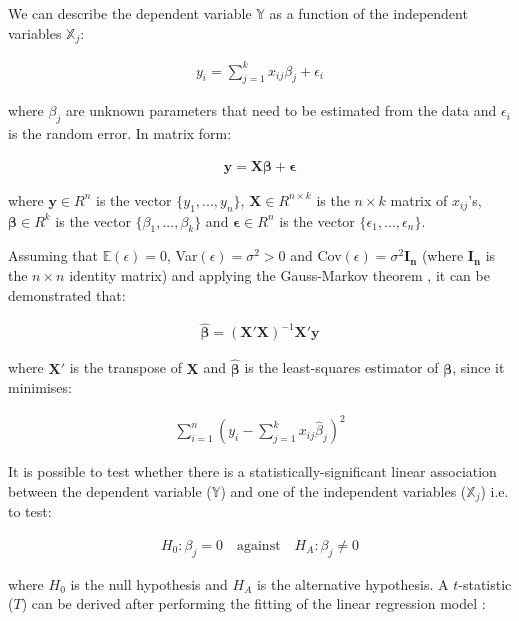We can describe the dependent variable $\mathbb Y$ as a function of the independent variables $\mathbb X_j$:

\begin{align}
y_i = \sum_{j=1}^{k} x_{ij}\beta_j + \epsilon_i
\end{align} 

where $\beta_j$ are unknown parameters that need to be estimated from the data and $\epsilon_i$ is the random error. In matrix form:

\begin{align}
\mathbf{y} = \mathbf{X}\mathbf{\beta} + \mathbf{\epsilon}
\end{align}

where  $\mathbf{y} \in R^n$ is the vector $\{y_1, ..., y_n\}$, $\mathbf{X} \in R^{n \times k}$ is the $n \times k$ matrix of $x_{ij}$'s, $\mathbf{\beta} \in R^k$ is the vector $\{\beta_1, ..., \beta_k\}$ and $\mathbf{\epsilon} \in R^n$ is the vector $\{\epsilon_1, ..., \epsilon_n\}$.

\bigskip

Assuming that $\mathbb E(\epsilon)=0$, Var$(\epsilon)=\sigma^2 > 0$ and Cov$(\epsilon)= \sigma^2\mathbf{I_n}$ (where $\mathbf{I_n}$ is the $n \times n$ identity matrix) and applying the Gauss-Markov theorem \citep{Eaton2007}, it can be demonstrated that:

\begin{align}
\mathbf{\hat{\beta}} = (\mathbf{X'}\mathbf{X})^{-1}\mathbf{X'}\mathbf{y}
\end{align}

where $\mathbf{X'}$ is the transpose of $\mathbf{X}$ and $\mathbf{\hat{\beta}}$ is the least-squares estimator of $\mathbf{\beta}$, since it minimises:

\begin{align}
\sum_{i=1}^{n} (y_i - \sum_{j=1}^{k} x_{ij}\hat{\beta}_j)^2
\end{align}

It is possible to test whether there is a statistically-significant linear association between the dependent variable ($\mathbb Y$) and one of the independent variables ($\mathbb X_j$) i.e. to test:

\begin{align}
H_0: \beta_j = 0 \quad \text{against} \quad H_A: \beta_j \ne 0
\end{align}
 
where $H_0$ is the null hypothesis and $H_A$ is the alternative hypothesis. A $t$-statistic ($T$) can be derived after performing the fitting of the linear regression model \citep{Sheather2009}:

